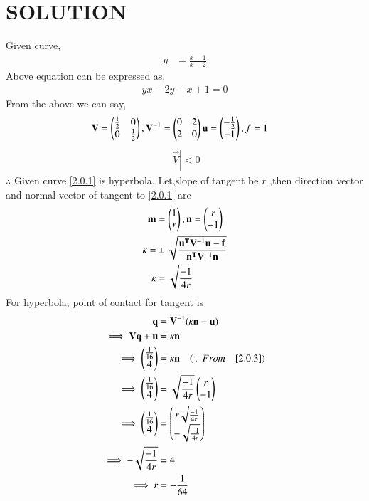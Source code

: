 \documentclass[journal,12pt,twocolumn]{IEEEtran}
\begin{document}
\section{SOLUTION}
Given curve,
\begin{align}
y&=\frac{{x-1}}{{x-2}} \label{2.0.1}
\end{align}
Above equation can be expressed as,
\begin{align}
yx-2y-x+1 =0
\end{align}
From the above we can say,
\begin{align}
\mathbf{V}&=\begin{pmatrix}\frac{1}{2} & 0 \\ 0 & \frac{1}{2}\end{pmatrix},\mathbf{V}^{-1}=\begin{pmatrix}0&2\\2&0\end{pmatrix}\mathbf{u}=\begin{pmatrix}-\frac{1}{2}\\-1\end{pmatrix},
f =1 \label{2.0.3}
\end{align}
\begin{align}
 |\vec{V}| < 0
\end{align}
$\therefore $ Given curve \eqref{2.0.1} is hyperbola.
Let,slope of tangent be $r$ ,then direction vector and normal vector of tangent to \eqref{2.0.1} are
\begin{align}
    \mathbf{m}&= \begin{pmatrix}1\\r\end{pmatrix},\mathbf{n}=\begin{pmatrix}r\\-1\end{pmatrix} \label{2.0.5}\\
\kappa=&\pm \sqrt{\frac{\mathbf{u^T}\mathbf{V}^{-1}\mathbf{u}-\mathbf{f}}{\mathbf{n^T}\mathbf{V}^{-1}\mathbf{n}}}\\
\kappa&=\sqrt{\frac{-1}{4r}} \label{2.0.8}
\end{align}
For hyperbola, point of contact for tangent is
\begin{align}
\mathbf{q}&=\mathbf{V}^{-1}(\kappa\mathbf{n}-\mathbf{u})\label{2.0.6}\\
\implies \mathbf{V}\mathbf{q}+\mathbf{u}&=\kappa\mathbf{n}\\
\implies \begin{pmatrix}\frac{1}{16}\\4\end{pmatrix}&=\kappa\mathbf{n} \quad (\because From\quad \eqref{2.0.3})\\
\implies \begin{pmatrix}\frac{1}{16}\\4\end{pmatrix}&=\sqrt{\frac{-1}{4r}}\begin{pmatrix}r\\-1\end{pmatrix}\\
\implies \begin{pmatrix}\frac{1}{16}\\4\end{pmatrix}&=\begin{pmatrix}r\sqrt{\frac{-1}{4r}}\\-\sqrt{\frac{-1}{4r}}\end{pmatrix}\\
\implies -\sqrt{\frac{-1}{4r}}&=4\\
\implies r &= -\frac{1}{64}
\end{align}
\end{document}
